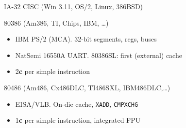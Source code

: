 \documentclass[mathserif,xcolor={dvipsnames,table}]{beamer}
\begin{document}
\begin{frame}[t]{IA-32 CISC (Win 3.11, OS/2, Linux, 386BSD)}
\begin{block}{80386 (Am386, TI, Chips, IBM, \ldots)}
\begin{itemize}
\item IBM PS/2 (MCA). 32-bit segments, regs, buses
\item NatSemi 16550A UART. 80386SL: first (external) cache
\item 2\textbf{c} per simple instruction
\end{itemize}
\end{block}
\begin{block}{80486 (Am486, Cx486DLC, TI486SXL, IBM486DLC,\ldots)}
\begin{itemize}
\item EISA/VLB. On-die cache, \texttt{XADD}, \texttt{CMPXCHG}
\item 1\textbf{c} per simple instruction, integrated FPU
\end{itemize}
\end{block}
\vfill
\begin{center}
\end{center}
\end{frame}
\end{document}
